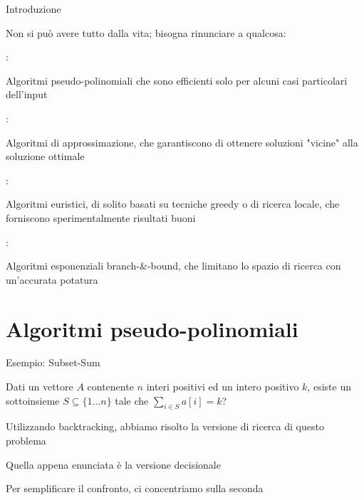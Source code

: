 \begin{frame}{Introduzione}


Non si può avere tutto dalla vita; bisogna rinunciare a qualcosa:

\smallskip
\BIL
\item {}: 
  \BI
  \item Algoritmi \alert{pseudo-polinomiali} che sono efficienti
    solo per alcuni casi particolari dell'input
  \EI
\item {}: 
  \BI
  \item Algoritmi di \alert{approssimazione}, che garantiscono di ottenere soluzioni "vicine" alla soluzione ottimale
  \EI
\item {}: 
  \BI
  \item Algoritmi \alert{euristici}, di solito basati su tecniche greedy o di ricerca locale, che forniscono sperimentalmente risultati buoni
  \EI
\item {}:
  \BI
  \item Algoritmi esponenziali \alert{branch-\&-bound}, che limitano lo spazio di ricerca con un'accurata potatura
  \EI
\EIL

\end{frame}


\section{Algoritmi pseudo-polinomiali}

\begin{frame}{Esempio: Subset-Sum}

\vspace{-9pt}
\begin{myboxtitle}
Dati un vettore $A$ contenente $n$ interi positivi ed un intero positivo $k$, \alert{esiste} un sottoinsieme $S \subseteq \{ 1 \ldots n\}$ tale che 
$\displaystyle \sum_{i \in S} a[i] = k$?
\end{myboxtitle}

\begin{overprint}
\BIL
\item Utilizzando \alert{backtracking}, abbiamo risolto la \alert{versione di ricerca} di questo problema
\item Quella appena enunciata è la \alert{versione decisionale}
\item Per semplificare il confronto, ci concentriamo sulla seconda
\EIL
\end{overprint}

\end{frame}



